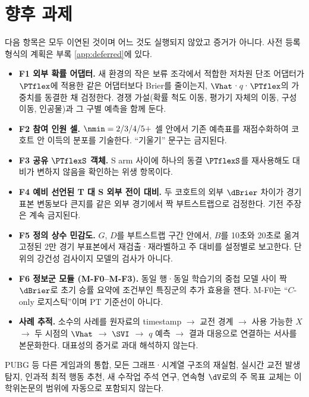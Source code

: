 \section{향후 과제}
\label{sec:disc-future}

다음 항목은 모두 이연된 것이며 어느 것도 실행되지 않았고 증거가 아니다. 사전 등록 형식의 계획은 부록 \ref{app:deferred}에 있다.

\begin{itemize}[leftmargin=1.5em]
  \item \textbf{F1 외부 확률 어댑터.} 새 환경의 작은 보류 조각에서 적합한 저차원 단조 어댑터가 $\PTflex$에 적용한 같은 어댑터보다 Brier를 줄이는지, $\Vhat$·$q$·$\PTflex$의 가중치를 동결한 채 검정한다. 경쟁 가설(확률 척도 이동, 평가기 자체의 이동, 구성 이동, 인공물)과 그 구별 예측을 함께 둔다.
  \item \textbf{F2 참여 인원 셀.} $\nmin = 2 / 3 / 4 / 5+$ 셀 안에서 기존 예측표를 재점수화하여 코호트 안 이득의 분포를 기술한다. ``기울기'' 문구는 금지된다.
  \item \textbf{F3 공유 $\PTflexS$ 객체.} S arm 사이에 하나의 동결 $\PTflexS$를 재사용해도 대비가 변하지 않음을 확인하는 위생 항목이다.
  \item \textbf{F4 예비 선언된 T 대 S 외부 전이 대비.} 두 코호트의 외부 $\dBrier$ 차이가 경기 표본 변동보다 큰지를 같은 외부 경기에서 짝 부트스트랩으로 검정한다. 기전 주장은 계속 금지된다.
  \item \textbf{F5 정의 상수 민감도.} $G$, $D$를 부트스트랩 구간 안에서, $B$를 10초와 20초로 옮겨 고정된 2만 경기 부표본에서 재검출·재라벨하고 주 대비를 설정별로 보고한다. 단위의 강건성 검사이지 모델의 검사가 아니다.
  \item \textbf{F6 정보군 모듈 (M-F0--M-F3).} 동일 행·동일 학습기의 중첩 모델 사이 짝 $\dBrier$로 초기 승률 요약에 조건부인 특징군의 추가 효용을 잰다. M-F0는 ``$C$-only 로지스틱''이며 PT 기준선이 아니다.
  \item \textbf{사례 추적.} 소수의 사례를 원자료의 timestamp $\to$ 교전 경계 $\to$ 사용 가능한 $X$ $\to$ 두 시점의 $\Vhat$ $\to$ $\SVI$ $\to$ $q$ 예측 $\to$ 결과 대응으로 연결하는 서사를 본문화한다. 대표성의 증거로 과대 해석하지 않는다.
\end{itemize}

PUBG 등 다른 게임과의 통합, 모든 그래프·시계열 구조의 재실험, 실시간 교전 발생 탐지, 인과적 최적 행동 추천, 새 수작업 주석 연구, 연속형 $\dV$로의 주 목표 교체는 이 학위논문의 범위에 자동으로 포함되지 않는다.
